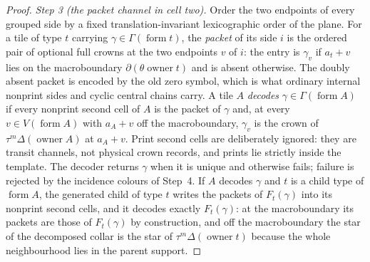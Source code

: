 \documentclass[11pt,a4paper]{article}
\theoremstyle{remark}
\begin{document}
\begin{proof}
\emph{Step 3 (the packet channel in cell two).}  Order the two endpoints of
every grouped side by a fixed translation-invariant lexicographic order of
the plane.  For a tile of type $t$ carrying $\gamma\in\Gamma(\operatorname
{form}t)$, the \emph{packet} of its side $i$ is the ordered pair of optional
full crowns at the two endpoints $v$ of $i$: the entry is $\gamma_v$ if
$a_t+v$ lies on the macroboundary $\partial(\theta\operatorname{owner}t)$
and is absent otherwise.  The doubly absent packet is encoded by the old
zero symbol, which is what ordinary internal nonprint sides and cyclic
central chains carry.  A tile $A$ \emph{decodes} $\gamma\in\Gamma(\operatorname
{form}A)$ if every nonprint second cell of $A$ is the packet of $\gamma$
and, at every $v\in V(\operatorname{form}A)$ with $a_A+v$ off the
macroboundary, $\gamma_v$ is the crown of $\tau^m\Delta(\operatorname
{owner}A)$ at $a_A+v$.  Print second cells are deliberately ignored: they
are transit channels, not physical crown records, and prints lie strictly
inside the template.  The decoder returns $\gamma$ when it is unique and
otherwise fails; failure is rejected by the incidence colours of Step~4.
If $A$ decodes $\gamma$ and $t$ is a child type of $\operatorname{form}A$,
the generated child of type $t$ writes the packets of $F_t(\gamma)$ into its
nonprint second cells, and it decodes exactly $F_t(\gamma)$: at the
macroboundary its packets are those of $F_t(\gamma)$ by construction, and
off the macroboundary the star of the decomposed collar is the star of
$\tau^m\Delta(\operatorname{owner}t)$ because the whole neighbourhood lies
in the parent support.


\end{proof}
\end{document}

